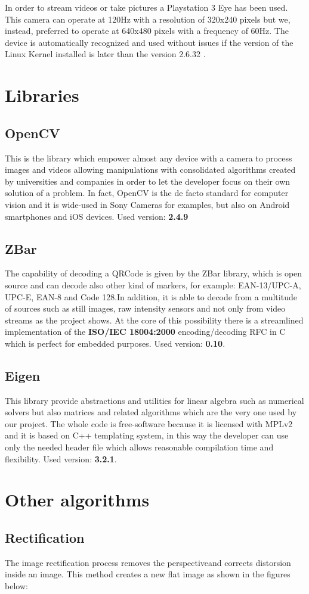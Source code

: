 In order to stream videos or take pictures a Playstation 3 Eye has been used.
This camera can operate at 120Hz with a resolution of 320x240 pixels but we, instead, preferred to operate at 640x480 pixels with a frequency of 60Hz.
The device is automatically recognized and used without issues if the version of the Linux Kernel installed is later than the version 2.6.32 .
 

\section{Libraries}

\subsection{OpenCV}
This is the library which empower almost any device with a camera to process images and videos allowing manipulations with consolidated algorithms created by universities and companies in order to let the developer focus on their own solution of a problem.
In fact, OpenCV is the de facto standard for computer vision and it is wide-used in Sony Cameras for examples, but also on Android smartphones and iOS devices. 
\newline Used version: \textbf{2.4.9}

\subsection{ZBar}

The capability of decoding a QRCode is given by the ZBar library, which is open source and can decode also other kind of markers, for example: EAN-13/UPC-A, UPC-E, EAN-8 and Code 128.In addition, it is able to decode from a multitude of sources such as still images, raw intensity sensors and not only from video streams as the project shows. At the core of this possibility there is a streamlined implementation of the \textbf{ISO/IEC 18004:2000} encoding/decoding RFC in C which is perfect for embedded purposes.
\newline Used version: \textbf{0.10}.

\subsection{Eigen}
This library provide abstractions and utilities for linear algebra such as numerical solvers but also matrices and related algorithms which are the very one used by our project.
The whole code is free-software because it is licensed with MPLv2 and it is based on C++ templating system, in this way the developer can use only the needed header file which allows reasonable compilation time and flexibility.\cite{eigeninfo}
\newline Used version: \textbf{3.2.1}.

\section{Other algorithms}

\subsection{Rectification}
The image rectification process removes the perspectiveand corrects distorsion inside an image.
This method creates a new flat image as shown in the figures below:




 
